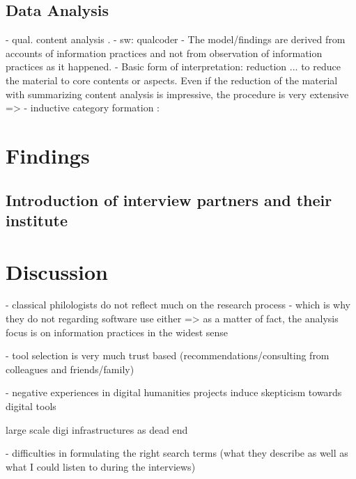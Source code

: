 \documentclass[12pt,a4paper,titlepage,oneside,abstract=true,toc=listof,toc=bibliography]{scrreprt}
\begin{document}
\section{Data Analysis}
- qual. content analysis \citep{Mayring2014}.
- sw: qualcoder
- The model/findings are derived from accounts of information practices and not from observation of information practices as it happened. 
- Basic form of interpretation: reduction \cite[p. 63]{Mayring2014} ... to reduce the material to core contents or aspects.
Even if the reduction of the material with summarizing content analysis is impressive, the procedure
is very extensive =>
- inductive category formation \cite[p. 79]{Mayring2014}: 

	
	
\chapter{Findings}

\section{Introduction of interview partners and their institute}


\chapter{Discussion}

- classical philologists do not reflect much on the research process - which is why they do not regarding software use either => as a matter of fact, the analysis focus is on information practices in the widest sense

- tool selection is very much trust based (recommendations/consulting from colleagues and friends/family)

- negative experiences in digital humanities projects induce skepticism towards digital tools

\cite{Zundert2012} large scale digi infrastructures as dead end

- difficulties in formulating the right search terms (what they describe as well as what I could listen to during the interviews)
\end{document}
